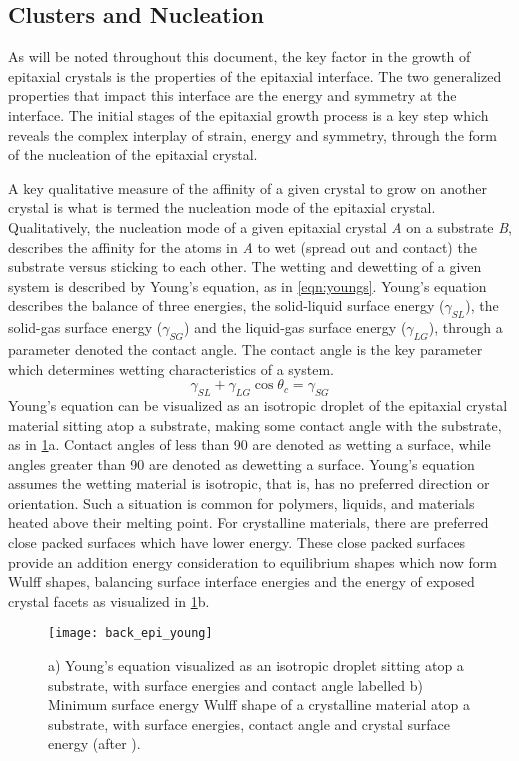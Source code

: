 \subsection{Clusters and Nucleation} As will be noted throughout this document, the key factor in the growth of epitaxial crystals is the properties of the epitaxial interface.
The two generalized properties that impact this interface are the energy and symmetry at the interface.
The initial stages of the epitaxial growth process is a key step which reveals the complex interplay of strain, energy and symmetry, through the form of the nucleation of the epitaxial crystal.

A key qualitative measure of the affinity of a given crystal to grow on another crystal is what is termed the nucleation mode of the epitaxial crystal.
Qualitatively, the nucleation mode of a given epitaxial crystal \emph{A} on a substrate \emph{B}, describes the affinity for the atoms in \emph{A} to wet (spread out and contact) the substrate versus sticking to each other.
The wetting and dewetting of a given system is described by Young's equation, as in \cref{eqn:youngs}.
Young's equation describes the balance of three energies, the solid-liquid surface energy (\(\gamma_{SL}\)), the solid-gas surface energy (\(\gamma_{SG}\)) and the liquid-gas surface energy (\(\gamma_{LG}\)), through a parameter denoted the contact angle.
The contact angle is the key parameter which determines wetting characteristics of a system.
\begin{equation}
 \gamma_{SL} + \gamma_{LG} \cos{\theta_c} = \gamma_{SG} \label{eqn:youngs}
\end{equation}
Young's equation can be visualized as an isotropic droplet of the epitaxial crystal material sitting atop a substrate, making some contact angle with the substrate, as in \cref{fig:back_epi_young}a.
Contact angles of less than 90\degree{} are denoted as wetting a surface, while angles greater than 90\degree{} are denoted as dewetting a surface.
Young's equation assumes the wetting material is isotropic, that is, has no preferred direction or orientation.
Such a situation is common for polymers, liquids, and materials heated above their melting point.
For crystalline materials, there are preferred close packed surfaces which have lower energy.
These close packed surfaces provide an addition energy consideration to equilibrium shapes which now form Wulff shapes, balancing surface interface energies and the energy of exposed crystal facets\cite{Venables1984} as visualized in \cref{fig:back_epi_young}b.
\begin{figure}
 \centering \texttt{[image: back\_epi\_young]}
 \caption[Young's equation]{\label{fig:back_epi_young}a) Young's equation visualized as an isotropic droplet sitting atop a substrate, with surface energies and contact angle labelled b) Minimum surface energy Wulff shape of a crystalline material atop a substrate, with surface energies, contact angle and crystal surface energy (after \cite{wikipedia_surface_energy}).}
\end{figure}

